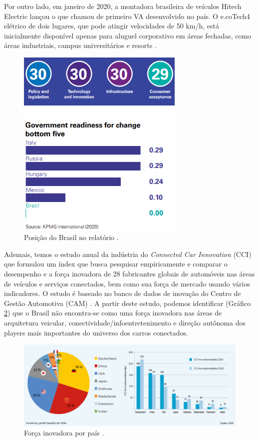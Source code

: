 Por outro lado, em janeiro de 2020, a montadora brasileira de veículos Hitech Electric lançou o que chamou de primeiro VA desenvolvido no país. O e.coTech4 elétrico de dois lugares, que pode atingir velocidades de 50 km/h, está inicialmente disponível apenas para aluguel corporativo em áreas fechadas, como áreas industriais, campus universitários e resorts \cite{KPMG}.

\begin{figure}[H]
\centering
\includegraphics[width=8cm]{Figures/rank30.png}
\caption{Posição do Brasil no relatório \cite{KPMG}.}
\label{rank30}
\end{figure}

Ademais, temos o estudo anual da indústria do \textit{Connected Car Innovation} (CCI) que formulou um índex que busca pesquisar empiricamente e comparar o desempenho e a força inovadora de 28 fabricantes globais de automóveis nas áreas de veículos e serviços conectados, bem como sua força de mercado usando vários indicadores. O estudo é baseado no banco de dados de inovação do Centro de Gestão Automotiva (CAM) \cite{CCI}. A partir deste estudo, podemos identificar (Gráfico \ref{forcaCCI}) que o Brasil não encontra-se como uma força inovadora nas áreas de arquitetura veicular, conectividade/infoentretenimento e direção autônoma dos players mais importantes do universo dos carros conectados.


\begin{figure}[H]
\centering
\includegraphics[width=12cm]{Figures/CCI.jpg}
\caption{Força inovadora por país  \cite{CCI}.}
\label{forcaCCI}
\end{figure}


